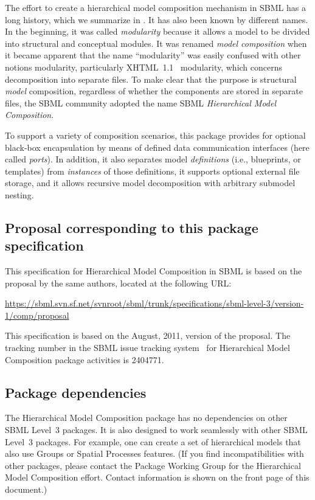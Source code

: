 The effort to create a hierarchical model composition mechanism in SBML has a long history, which we summarize in .  It has also been known by different names.  In the beginning, it was called \emph{modularity} because it allows a model to be divided into structural and conceptual modules.  It was renamed \emph{model   composition} when it became apparent that the name ``modularity'' was easily confused with other notions modularity, particularly XHTML~1.1~\citep{xhtml} modularity, which concerns decomposition into separate files.  To make clear that the purpose is structural \emph{model} composition, regardless of whether the components are stored in separate files, the SBML community adopted the name SBML \emph{Hierarchical Model Composition}.

To support a variety of composition scenarios, this package provides for optional black-box encapsulation by means of defined data communication interfaces (here called \emph{ports}).  In addition, it also separates model \emph{definitions} (i.e., blueprints, or templates) from \emph{instances} of those definitions, it supports optional external file storage, and it allows recursive model decomposition with arbitrary submodel nesting.


\subsection{Proposal corresponding to this package specification}

This specification for Hierarchical Model Composition in SBML is based on the proposal by the same authors, located at the following URL:

\begin{center}
  \vspace*{1ex}\small
  \url{https://sbml.svn.sf.net/svnroot/sbml/trunk/specifications/sbml-level-3/version-1/comp/proposal}
  \vspace*{1ex}
\end{center}

This specification is based on the August, 2011, version of the proposal.  The tracking number in the SBML issue tracking system~\citep{tracker} for Hierarchical Model Composition package activities is 2404771.


\subsection{Package dependencies}

The Hierarchical Model Composition package has no dependencies on other SBML Level~3 packages.  It is also designed to work seamlessly with other SBML Level~3 packages.  For example, one can create a set of hierarchical models that also use Groups or Spatial Processes features. (If you find incompatibilities with other packages, please contact the Package Working Group for the Hierarchical Model Composition effort. Contact information is shown on the front page of this document.)


